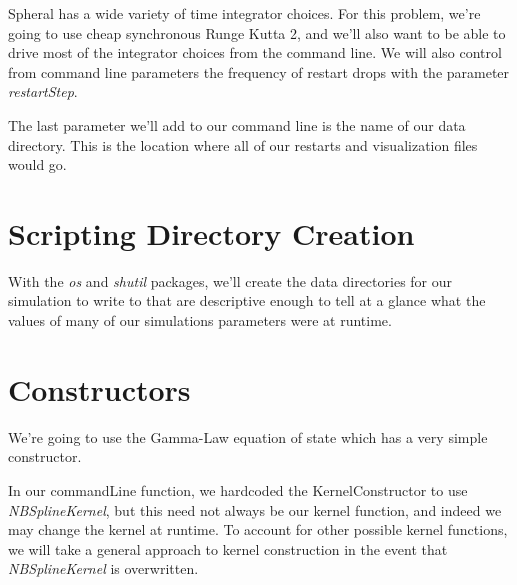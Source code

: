 \documentclass[11pt]{memoir}
\begin{document}


Spheral has a wide variety of time integrator choices. 
For this problem, we're going to use cheap synchronous Runge Kutta 2, and we'll also want to be able to drive most of the integrator choices from the command line. 
We will also control from command line parameters the frequency of restart drops with the parameter \textit{restartStep}.



The last parameter we'll add to our command line is the name of our data directory. 
This is the location where all of our restarts and visualization files would go.



\section{Scripting Directory Creation}

With the \textit{os} and \textit{shutil} packages, we'll create the data directories for our simulation to write to that are descriptive enough to tell at a glance what the values of many of our simulations parameters were at runtime.



\section{Constructors}

We're going to use the Gamma-Law equation of state which has a very simple constructor.



In our commandLine function, we hardcoded the KernelConstructor to use \textit{NBSplineKernel}, but this need not always be our kernel function, and indeed we may change the kernel at runtime.
To account for other possible kernel functions, we will take a general approach to kernel construction in the event that \textit{NBSplineKernel} is overwritten.


\end{document}
